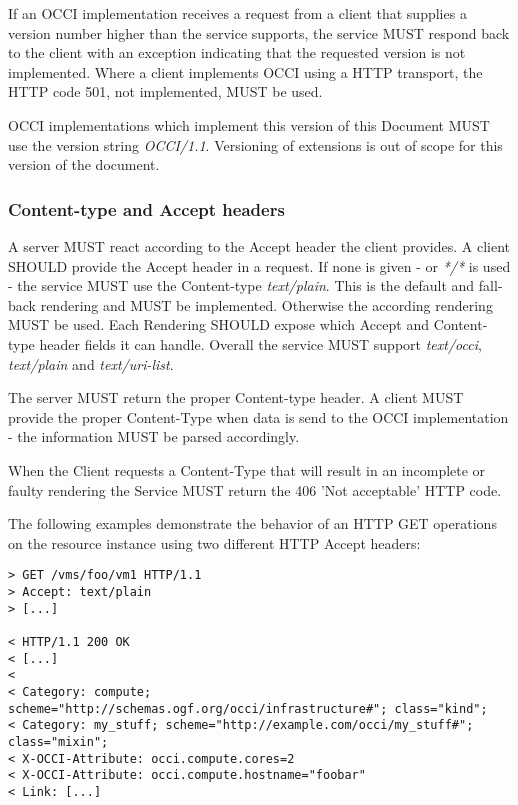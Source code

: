 \documentclass[10pt,a4paper]{article}
\begin{document}
If an OCCI implementation receives a request from a client that
supplies a version number higher than the service supports, the
service MUST respond back to the client with an exception indicating
that the requested version is not implemented. Where a client
implements OCCI using a HTTP transport, the HTTP code 501, not
implemented, MUST be used.

OCCI implementations which implement this version of this Document
MUST use the version string \emph{OCCI/1.1}. Versioning of extensions
is out of scope for this version of the document.

\subsubsection{Content-type and Accept headers}
\label{sec:content_type}
A server MUST react according to the Accept header the client
provides. A client SHOULD provide the Accept header in a request. If
none is given - or \textit{*/*} is used - the service MUST use the
Content-type \emph{text/plain}. This is the default and fall-back
rendering and MUST be implemented. Otherwise the according rendering
MUST be used. Each Rendering SHOULD expose which Accept and
Content-type header fields it can handle. Overall the service MUST
support \textit{text/occi}, \textit{text/plain} and
\textit{text/uri-list}.

The server MUST return the proper Content-type header. A client MUST
provide the proper Content-Type when data is send to the OCCI
implementation - the information MUST be parsed accordingly.

When the Client requests a Content-Type that will result in an
incomplete or faulty rendering the Service MUST return the 406 'Not
acceptable' HTTP code.

The following examples demonstrate the behavior of an HTTP GET
operations on the resource instance \emph{} using two different HTTP
Accept headers:

\begin{verbatim}
> GET /vms/foo/vm1 HTTP/1.1
> Accept: text/plain
> [...]

< HTTP/1.1 200 OK
< [...]
<
< Category: compute; scheme="http://schemas.ogf.org/occi/infrastructure#"; class="kind";
< Category: my_stuff; scheme="http://example.com/occi/my_stuff#"; class="mixin"; 
< X-OCCI-Attribute: occi.compute.cores=2
< X-OCCI-Attribute: occi.compute.hostname="foobar"
< Link: [...]
\end{verbatim}
\end{document}
